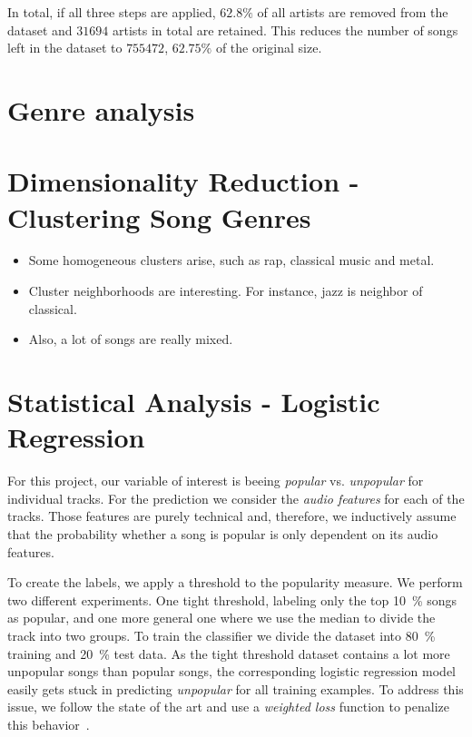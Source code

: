 \documentclass{article}
\begin{document}
In total, if all three steps are applied, $62.8\%$ of all artists are removed from the dataset and $31694$ artists in total are retained. This reduces the number of songs left in the dataset to $755472$, $62.75\%$ of the original size.

\section{Genre analysis}
\label{sec:genre}


\section{Dimensionality Reduction - Clustering Song Genres}



\begin{itemize}
  \item Some homogeneous clusters arise, such as rap, classical music and metal. 
  \item Cluster neighborhoods are interesting. For instance, jazz is neighbor of classical.
  \item Also, a lot of songs are really mixed.
\end{itemize}

\section{Statistical Analysis - Logistic Regression}
For this project, our variable of interest is beeing \textit{popular} vs. \textit{unpopular} for individual tracks.
For the prediction we consider the \textit{audio features} for each of the tracks. 
Those features are purely technical and, therefore, we inductively assume that the probability whether a song is popular is only dependent on its audio features. 

To create the labels, we apply a threshold to the popularity measure. 
We perform two different experiments. 
One tight threshold, labeling only the top \SI{10}{\percent} songs as popular, and one more general one where we use the median to divide the track into two groups.
To train the classifier we divide the dataset into \SI{80}{\percent} training and \SI{20}{\percent} test data.
As the tight threshold dataset contains a lot more unpopular songs than popular songs, the corresponding logistic regression model easily gets stuck in predicting \textit{unpopular} for all training examples. 
To address this issue, we follow the state of the art and use a \textit{weighted loss} function to penalize this behavior~\cite{haixiangLearningClassimbalancedData2017a}.
\end{document}
